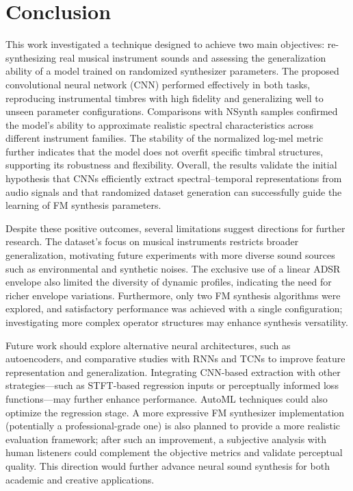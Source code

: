 \documentclass[10pt,conference]{IEEEtran}
\begin{document}
\section{Conclusion} \label{sec:conclusion}

This work investigated a technique designed to achieve two main objectives: re-synthesizing real musical instrument sounds and assessing the generalization ability of a model trained on randomized synthesizer parameters. The proposed convolutional neural network (CNN) performed effectively in both tasks, reproducing instrumental timbres with high fidelity and generalizing well to unseen parameter configurations. Comparisons with NSynth samples confirmed the model’s ability to approximate realistic spectral characteristics across different instrument families. The stability of the normalized log-mel metric further indicates that the model does not overfit specific timbral structures, supporting its robustness and flexibility. Overall, the results validate the initial hypothesis that CNNs efficiently extract spectral–temporal representations from audio signals and that randomized dataset generation can successfully guide the learning of FM synthesis parameters.

Despite these positive outcomes, several limitations suggest directions for further research. The dataset’s focus on musical instruments restricts broader generalization, motivating future experiments with more diverse sound sources such as environmental and synthetic noises. The exclusive use of a linear ADSR envelope also limited the diversity of dynamic profiles, indicating the need for richer envelope variations. Furthermore, only two FM synthesis algorithms were explored, and satisfactory performance was achieved with a single configuration; investigating more complex operator structures may enhance synthesis versatility.

Future work should explore alternative neural architectures, such as autoencoders, and comparative studies with RNNs and TCNs to improve feature representation and generalization. Integrating CNN-based extraction with other strategies—such as STFT-based regression inputs or perceptually informed loss functions—may further enhance performance. AutoML techniques could also optimize the regression stage. A more expressive FM synthesizer implementation (potentially a professional-grade one) is also planned to provide a more realistic evaluation framework; after such an improvement, a subjective analysis with human listeners could complement the objective metrics and validate perceptual quality. This direction would further advance neural sound synthesis for both academic and creative applications.

\balance



\end{document}
